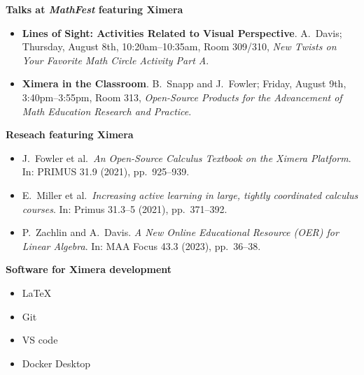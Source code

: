 \documentclass{article}
\begin{document}
\begin{multicols}{2}
    \begin{xframe}
        {\sffamily\bfseries Talks at \textsl{MathFest} featuring Ximera}
        \begin{itemize}
            \item[{[1]}] \textbf{Lines of Sight: Activities Related to Visual
                Perspective}. A.\ Davis; Thursday, August 8th,
            10:20am--10:35am,
            Room 309/310,
            \textit{New Twists on Your Favorite Math Circle Activity Part A}.
            \item[{[2]}] \textbf{Ximera in the Classroom}. B.\ Snapp and J.\
            Fowler;
            Friday, August 9th, 3:40pm--3:55pm, Room 313, \textit{Open-Source
                Products for
                the Advancement of Math Education Research and Practice}.
        \end{itemize}
    \end{xframe}
    \begin{xframe}
        {\sffamily\bfseries Reseach featuring Ximera}
        \begin{itemize}
            \item[{[3]}] J.\ Fowler et al.\ \textit{An Open-Source Calculus Textbook on the Ximera Platform}. In:
            PRIMUS 31.9 (2021), pp.\ 925--939. %
            \item[{[4]}] E.\ Miller et al.\ \textit{Increasing active learning in large, tightly coordinated 
            calculus courses}.
            In: Primus 31.3--5 (2021), pp.\ 371--392.
            \item[{[5]}] P.\ Zachlin and A.\ Davis. \textit{A New Online Educational Resource (OER) 
            for Linear Algebra}. In: MAA Focus 43.3 (2023), pp.\ 36--38.
         \end{itemize}
    \end{xframe}

    \begin{xframe}
        {\sffamily\bfseries Software for Ximera development}
        \begin{itemize}
            \item \LaTeX\
            \item Git
            \item VS code
            \item Docker Desktop
        \end{itemize}
    \end{xframe}

\end{multicols}
\end{document}
